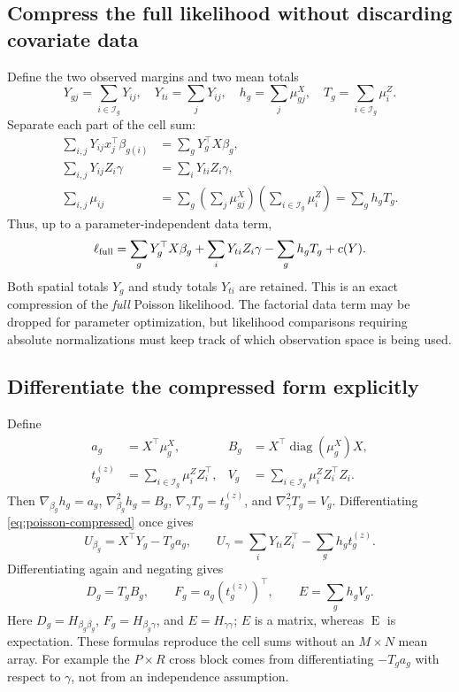 \documentclass[11pt,a4paper]{article}
\newcommand{\E}{\operatorname{E}}
\newcommand{\diag}{\operatorname{diag}}
\numberwithin{equation}{section}
\begin{document}
\subsection{Compress the full likelihood without discarding covariate data}
Define the two observed margins and two mean totals
\begin{equation}
 Y_{gj}=\sum_{i\in\mathcal I_g}Y_{ij},\quad
 Y_{ti}=\sum_jY_{ij},\quad
 h_g=\sum_j\mu_{gj}^X,\quad T_g=\sum_{i\in\mathcal I_g}\mu_i^Z.
 \label{eq:margins}
\end{equation}
Separate each part of the cell sum:
\begin{align}
 \sum_{i,j}Y_{ij}x_j^\top\beta_{g(i)}
 &=\sum_g Y_g^\top X\beta_g,\\
 \sum_{i,j}Y_{ij}{Z_i}\gamma&=\sum_i Y_{ti} {Z_i}\gamma,\\
 \sum_{i,j}\mu_{ij}
 &=\sum_g\left(\sum_j\mu_{gj}^X\right)
            \left(\sum_{i\in\mathcal I_g}\mu_i^Z\right)=\sum_gh_gT_g .
\end{align}
Thus, up to a parameter-independent data term,
\begin{equation}
 \ell_{\rm full}
 =\sum_g Y_g^\top X\beta_g+\sum_i Y_{ti} {Z_i}\gamma
       -\sum_gh_gT_g+c(Y). \label{eq:poisson-compressed}
\end{equation}
Both spatial totals $Y_g$ and study totals $Y_{ti}$ are retained.
This is an exact compression of the \emph{full} Poisson likelihood.
The factorial data term may be dropped for parameter optimization,
but likelihood comparisons requiring absolute normalizations must
keep track of which observation space is being used.

\subsection{Differentiate the compressed form explicitly}
Define
\begin{align}
 a_g&=X^\top \mu_g^X,&
 B_g&=X^\top\diag(\mu_g^X)X,\\
 t_g^{(z)}&=\sum_{i\in\mathcal I_g}\mu_i^Z{Z_i^\top},&
 V_g&=\sum_{i\in\mathcal I_g}\mu_i^Z{Z_i^\top}{Z_i} .
\end{align}
Then $\nabla_{\beta_g}h_g=a_g$, $\nabla_{\beta_g}^2h_g=B_g$,
$\nabla_\gamma T_g=t_g^{(z)}$, and $\nabla_\gamma^2T_g=V_g$.
Differentiating \eqref{eq:poisson-compressed} once gives
\begin{equation}
 U_{\beta_g}=X^\top Y_g-T_ga_g,\qquad
 U_\gamma=\sum_i Y_{ti}{Z_i^\top}-\sum_gh_gt_g^{(z)} .
\end{equation}
Differentiating again and negating gives
\begin{equation}
 D_g=T_gB_g,\qquad F_g=a_g(t_g^{(z)})^\top,\qquad
 E=\sum_gh_gV_g . \label{eq:poisson-blocks}
\end{equation}
Here $D_g=H_{\beta_g\beta_g}$, $F_g=H_{\beta_g\gamma}$,
and $E=H_{\gamma\gamma}$; $E$ is a matrix, whereas $\E$ is expectation.
These formulas reproduce the cell sums without an $M\times N$ mean array.
For example the $P\times R$ cross block comes from differentiating
$-T_ga_g$ with respect to $\gamma$, not from an independence assumption.
\end{document}
